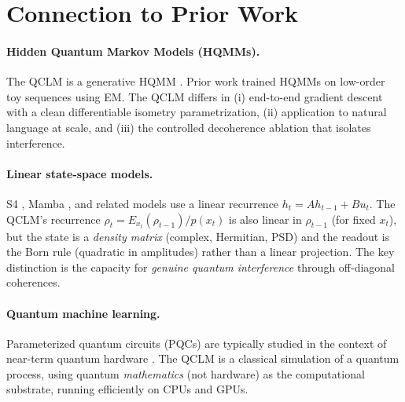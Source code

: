 \documentclass[11pt,a4paper]{article}
\newcommand{\Ex}[1]{E_{#1}}         %
\theoremstyle{plain}
\begin{document}
\section{Connection to Prior Work}

\paragraph{Hidden Quantum Markov Models (HQMMs).}
The QCLM is a generative HQMM \cite{monras2010,srinivasan2018}. Prior
work trained HQMMs on low-order toy sequences using EM. The QCLM differs
in (i) end-to-end gradient descent with a clean differentiable isometry
parametrization, (ii) application to natural language at scale, and
(iii) the controlled decoherence ablation that isolates interference.

\paragraph{Linear state-space models.}
S4 \cite{gu2021}, Mamba \cite{gu2023}, and related models use a linear
recurrence $h_t = A h_{t-1} + B u_t$. The QCLM's recurrence
$\rho_t = \Ex{x_t}(\rho_{t-1})/p(x_t)$ is also linear in $\rho_{t-1}$
(for fixed $x_t$), but the state is a \emph{density matrix} (complex,
Hermitian, PSD) and the readout is the Born rule (quadratic in
amplitudes) rather than a linear projection. The key distinction is the
capacity for \emph{genuine quantum interference} through off-diagonal
coherences.

\paragraph{Quantum machine learning.}
Parameterized quantum circuits (PQCs) are typically studied in the
context of near-term quantum hardware \cite{cerezo2021}. The QCLM is
a classical simulation of a quantum process, using quantum \emph{mathematics}
(not hardware) as the computational substrate, running efficiently on
CPUs and GPUs.
\end{document}
